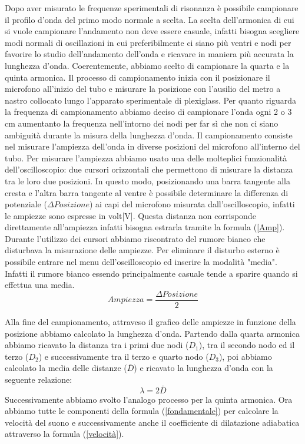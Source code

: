 \documentclass[11pt]{article}
\begin{document}
Dopo aver misurato le frequenze sperimentali di risonanza è possibile campionare il profilo d'onda del primo modo normale a scelta. La scelta dell'armonica di cui si vuole campionare l'andamento non deve essere casuale, infatti bisogna scegliere modi normali di oscillazioni in cui preferibilmente ci siano più ventri e nodi per favorire lo studio dell'andamento dell'onda e ricavare in maniera più accurata la lunghezza d'onda. Coerentemente, abbiamo scelto di campionare la quarta e la quinta armonica.
Il processo di campionamento inizia con il posizionare il microfono all'inizio del tubo e misurare la posizione con l'ausilio del metro a nastro collocato lungo l'apparato sperimentale di plexiglass. Per quanto riguarda la frequenza di campionamento abbiamo deciso di campionare l'onda ogni 2 o 3 cm aumentanto la frequenza nell'intorno dei nodi per far sì che non ci siano ambiguità durante la misura della lunghezza d'onda. Il campionamento consiste nel misurare l'ampiezza dell'onda in diverse posizioni del microfono all'interno del tubo. Per misurare l'ampiezza abbiamo usato una delle molteplici funzionalità dell'oscilloscopio: due cursori orizzontali che permettono di misurare la distanza tra le loro due posizioni. In questo modo, posizionando una barra tangente alla cresta e l'altra barra tangente al ventre è possibile determinare la differenza di potenziale ($\Delta Posizione$) ai capi del microfono misurata dall’oscilloscopio, infatti le ampiezze sono espresse in volt[V]. Questa distanza non corrisponde direttamente all'ampiezza infatti bisogna estrarla tramite la formula (\ref{Amp}). Durante l'utilizzo dei cursori abbiamo riscontrato del rumore bianco che disturbava la misurazione delle ampiezze. Per eliminare il disturbo esterno è possibile entrare nel menu dell'oscilloscopio ed inserire la modalità "media". Infatti il rumore bianco essendo principalmente casuale tende a sparire quando si effettua una media. 
\begin{equation}
    Ampiezza = \frac{\Delta Posizione}{2}
    \label{Amp}
\end{equation}

Alla fine del campionamento, attraveso il grafico delle ampiezze in funzione della posizione abbiamo calcolato la lunghezza d'onda. Partendo dalla quarta armonica abbiamo ricavato la distanza tra i primi due nodi ($D_1$), tra il secondo nodo ed il terzo ($D_2$) e successivamente tra il terzo e quarto nodo ($D_3$), poi abbiamo calcolato la media delle distanze ($\bar{D}$) e ricavato la lunghezza d'onda con la seguente relazione:
\begin{equation}
    \lambda = 2 \bar{D}
\label{distanza}
\end{equation}
Successivamente abbiamo svolto l'analogo processo per la quinta armonica. Ora abbiamo tutte le componenti della formula (\ref{fondamentale}) per calcolare la velocità del suono e successivamente anche il coefficiente di dilatazione adiabatica attraverso la formula (\ref{velocità}).
\end{document}
